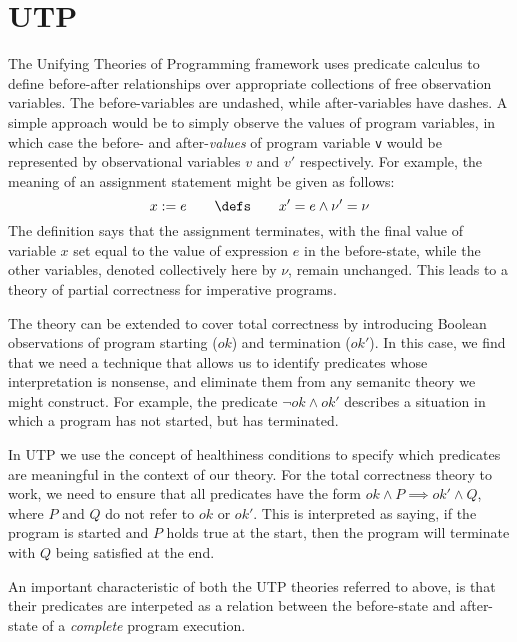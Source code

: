 \section{UTP}\label{sec:UTP}

The Unifying Theories of Programming framework \cite{Hoare-He98}
uses predicate calculus to define before-after relationships
over appropriate collections of free observation variables.
The before-variables are undashed,
while after-variables have dashes.
A simple approach would be to simply observe the values of program variables,
in which case the before- and after-\emph{values}
of program variable \texttt{v}
would be represented by observational variables $v$ and $v'$ respectively.
For example,
the meaning of an assignment statement might be given as follows:
\begin{equation*}
  x := e  \qquad\defs\qquad  x' = e \land \nu'=\nu
\end{equation*}
The definition says that the assignment terminates,
with the final value of variable $x$ set equal
to the value of expression $e$ in the before-state,
while the other variables, denoted collectively here  by $\nu$, remain unchanged.
This leads to a theory of partial correctness for imperative programs.

The theory can be extended to cover total correctness by introducing
Boolean observations of program starting ($ok$) and termination ($ok'$).
In this case, we find that we need a technique that allows us to identify
predicates whose interpretation is nonsense, and eliminate them from any
semanitc theory we might construct.
For example, the predicate $\lnot ok \land ok'$ describes a situation
in which a program has not started, but has terminated.

In UTP we use the concept of healthiness conditions to specify which predicates
are meaningful in the context of our theory.
For the total correctness theory to work,
we need to ensure that all predicates have the form
$ok \land P \implies ok' \land Q$, where $P$ and $Q$ do not refer to $ok$ or $ok'$.
This is interpreted as saying,
if the program is started and $P$ holds true at the start,
then the program will terminate with $Q$ being satisfied at the end.

An important characteristic of both the UTP theories referred to above,
is that their predicates are interpeted as a relation between the before-state
and after-state of a \emph{complete} program execution.

